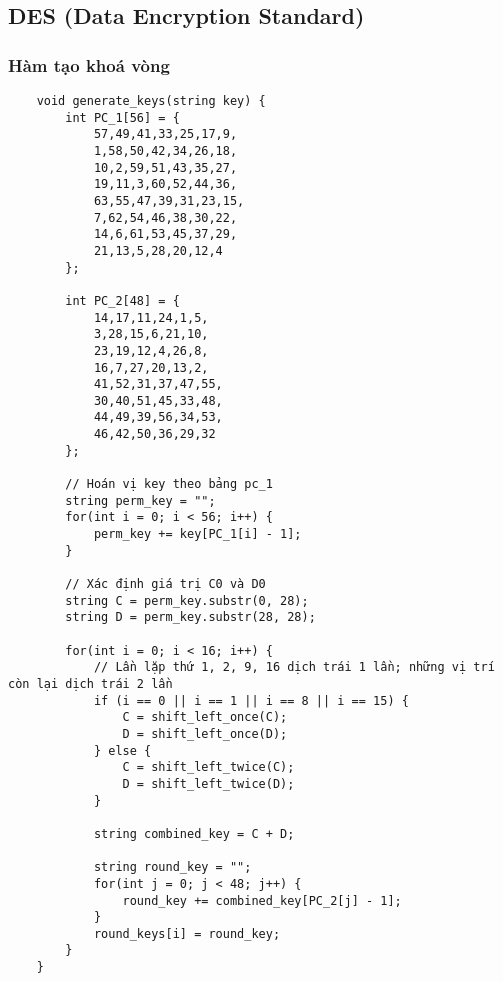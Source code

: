 \subsection{DES (Data Encryption Standard)}
\subsubsection{Hàm tạo khoá vòng}
\begin{verbatim}
	void generate_keys(string key) {
		int PC_1[56] = {
			57,49,41,33,25,17,9, 
			1,58,50,42,34,26,18, 
			10,2,59,51,43,35,27, 
			19,11,3,60,52,44,36,		 
			63,55,47,39,31,23,15, 
			7,62,54,46,38,30,22, 
			14,6,61,53,45,37,29, 
			21,13,5,28,20,12,4 
		};
		
		int PC_2[48] = {
			14,17,11,24,1,5, 
			3,28,15,6,21,10, 
			23,19,12,4,26,8, 
			16,7,27,20,13,2, 
			41,52,31,37,47,55, 
			30,40,51,45,33,48, 
			44,49,39,56,34,53, 
			46,42,50,36,29,32 
		};
		
		// Hoán vị key theo bảng pc_1
		string perm_key = "";
		for(int i = 0; i < 56; i++) {
			perm_key += key[PC_1[i] - 1];
		}
		
		// Xác định giá trị C0 và D0
		string C = perm_key.substr(0, 28);
		string D = perm_key.substr(28, 28);
		
		for(int i = 0; i < 16; i++) {
			// Lần lặp thứ 1, 2, 9, 16 dịch trái 1 lần; những vị trí còn lại dịch trái 2 lần
			if (i == 0 || i == 1 || i == 8 || i == 15) {
				C = shift_left_once(C);
				D = shift_left_once(D);
			} else {
				C = shift_left_twice(C);
				D = shift_left_twice(D);
			}
			
			string combined_key = C + D;
			
			string round_key = "";
			for(int j = 0; j < 48; j++) {
				round_key += combined_key[PC_2[j] - 1];
			}
			round_keys[i] = round_key; 
		}
	}
\end{verbatim}

